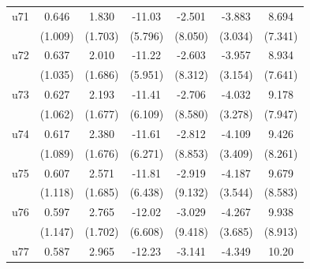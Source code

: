 \begin{table}[htbp]
\begin{tabular}{l*{6}{c}}
\addlinespace
u71                 &       0.646         &       1.830         &      -11.03\sym{*}  &      -2.501         &      -3.883         &       8.694         \\
                    &     (1.009)         &     (1.703)         &     (5.796)         &     (8.050)         &     (3.034)         &     (7.341)         \\
\addlinespace
u72                 &       0.637         &       2.010         &      -11.22\sym{*}  &      -2.603         &      -3.957         &       8.934         \\
                    &     (1.035)         &     (1.686)         &     (5.951)         &     (8.312)         &     (3.154)         &     (7.641)         \\
\addlinespace
u73                 &       0.627         &       2.193         &      -11.41\sym{*}  &      -2.706         &      -4.032         &       9.178         \\
                    &     (1.062)         &     (1.677)         &     (6.109)         &     (8.580)         &     (3.278)         &     (7.947)         \\
\addlinespace
u74                 &       0.617         &       2.380         &      -11.61\sym{*}  &      -2.812         &      -4.109         &       9.426         \\
                    &     (1.089)         &     (1.676)         &     (6.271)         &     (8.853)         &     (3.409)         &     (8.261)         \\
\addlinespace
u75                 &       0.607         &       2.571         &      -11.81\sym{*}  &      -2.919         &      -4.187         &       9.679         \\
                    &     (1.118)         &     (1.685)         &     (6.438)         &     (9.132)         &     (3.544)         &     (8.583)         \\
\addlinespace
u76                 &       0.597         &       2.765         &      -12.02\sym{*}  &      -3.029         &      -4.267         &       9.938         \\
                    &     (1.147)         &     (1.702)         &     (6.608)         &     (9.418)         &     (3.685)         &     (8.913)         \\
\addlinespace
u77                 &       0.587         &       2.965\sym{*}  &      -12.23\sym{*}  &      -3.141         &      -4.349         &       10.20         \\

\end{tabular}
\end{table}
